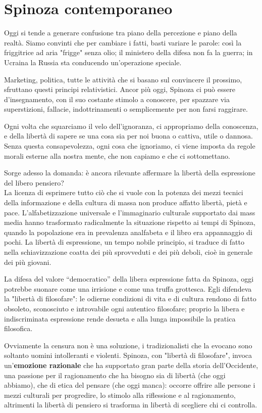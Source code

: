 \chapter{Spinoza contemporaneo}

Oggi si tende a generare confusione tra piano della percezione e piano della realtà. Siamo convinti che per cambiare i fatti, basti variare le parole: così la friggitrice ad aria "frigge" senza olio; il ministero della difesa non fa la guerra; in Ucraina la Russia sta conducendo un'operazione speciale.

Marketing, politica, tutte le attività che si basano sul convincere il prossimo, sfruttano questi principi relativistici. Ancor più oggi, Spinoza ci può essere d'insegnamento, con il suo costante stimolo a conoscere, per spazzare via superstizioni, fallacie, indottrinamenti o semplicemente per non farsi raggirare.

Ogni volta che squarciamo il velo dell'ignoranza, ci appropriamo della conoscenza, e della libertà di sapere se una cosa sia per noi buona o cattiva, utile o dannosa. Senza questa consapevolezza, ogni cosa che ignoriamo, ci viene imposta da regole morali esterne alla nostra mente, che non capiamo e che ci sottomettano.

Sorge adesso la domanda: è ancora rilevante affermare la libertà della espressione del libero pensiero? \\
La licenza di
esprimere tutto ciò che si vuole con la potenza dei mezzi tecnici della informazione e della
cultura di massa non produce affatto libertà, pietà e pace. L'alfabetizzazione universale e
l'immaginario culturale supportato dai mass media hanno
trasformato radicalmente la situazione rispetto ai tempi di Spinoza, quando la popolazione era in
prevalenza analfabeta e il libro era appannaggio di pochi. La libertà di espressione, un tempo nobile
principio, si traduce di fatto nella schiavizzazione coatta dei
più sprovveduti e dei più deboli, cioè in generale dei più giovani.

La difesa del valore
“democratico” della libera espressione fatta da Spinoza, oggi potrebbe suonare come una irrisione e come una truffa grottesca. Egli  difendeva la "libertà di filosofare": le
odierne condizioni di vita e di cultura rendono di fatto obsoleto, sconosciuto e introvabile
ogni autentico filosofare; proprio la libera e indiscriminata espressione
rende desueta e alla lunga impossibile la pratica filosofica.

Ovviamente la censura non è una soluzione, i tradizionalisti che la evocano sono soltanto uomini intolleranti e violenti. Spinoza, con "libertà di filosofare", invoca un'\textbf{emozione razionale} che ha supportato gran parte della storia
dell'Occidente, una passione per il ragionamento che ha bisogno sia di libertà (che oggi abbiamo), che di etica del pensare (che oggi manca): occorre offrire alle persone i mezzi culturali per progredire, lo stimolo alla riflessione e al ragionamento, altrimenti la libertà di pensiero si trasforma in libertà di scegliere chi ci controlla.

